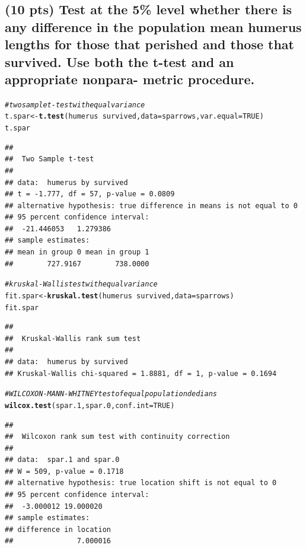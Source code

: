 \documentclass{article}\usepackage[]{graphicx}\usepackage[]{color}
\makeatletter
\newcommand{\hlnum}[1]{\textcolor[rgb]{0.686,0.059,0.569}{#1}}%
\newcommand{\hlcom}[1]{\textcolor[rgb]{0.678,0.584,0.686}{\textit{#1}}}%
\newcommand{\hlopt}[1]{\textcolor[rgb]{0,0,0}{#1}}%
\newcommand{\hlstd}[1]{\textcolor[rgb]{0.345,0.345,0.345}{#1}}%
\newcommand{\hlkwb}[1]{\textcolor[rgb]{0.69,0.353,0.396}{#1}}%
\newcommand{\hlkwc}[1]{\textcolor[rgb]{0.333,0.667,0.333}{#1}}%
\newcommand{\hlkwd}[1]{\textcolor[rgb]{0.737,0.353,0.396}{\textbf{#1}}}%
\newenvironment{kframe}{%
 \def\at@end@of@kframe{}%
 \ifinner\ifhmode%
  \def\at@end@of@kframe{\end{minipage}}%
  \begin{minipage}{\columnwidth}%
 \fi\fi%
 \def\FrameCommand##1{\hskip\@totalleftmargin \hskip-\fboxsep
 \colorbox{shadecolor}{##1}\hskip-\fboxsep
     \hskip-\linewidth \hskip-\@totalleftmargin \hskip\columnwidth}%
 \MakeFramed {\advance\hsize-\width
   \@totalleftmargin\z@ \linewidth\hsize
   \@setminipage}}%
 {\par\unskip\endMakeFramed%
 \at@end@of@kframe}
\newenvironment{knitrout}{}{} %
\makeatother
\begin{document}
\subsection{(10 pts) Test at the 5\% level whether there is any difference in the population mean humerus lengths for those that perished and those that survived. Use both the t-test and an appropriate nonpara-
metric procedure.}
\begin{knitrout}
\color{fgcolor}\begin{kframe}
\begin{alltt}
\hlcom{# two sample t-test with equal variance}
\hlstd{t.spar} \hlkwb{<-} \hlkwd{t.test}\hlstd{(humerus} \hlopt{~} \hlstd{survived,} \hlkwc{data} \hlstd{= sparrows,} \hlkwc{var.equal} \hlstd{=} \hlnum{TRUE}\hlstd{)}
\hlstd{t.spar}
\end{alltt}
\begin{verbatim}
## 
## 	Two Sample t-test
## 
## data:  humerus by survived
## t = -1.777, df = 57, p-value = 0.0809
## alternative hypothesis: true difference in means is not equal to 0
## 95 percent confidence interval:
##  -21.446053   1.279386
## sample estimates:
## mean in group 0 mean in group 1 
##        727.9167        738.0000
\end{verbatim}
\begin{alltt}
\hlcom{# kruskal-Wallis test with equal variance}
\hlstd{fit.spar} \hlkwb{<-} \hlkwd{kruskal.test}\hlstd{(humerus} \hlopt{~} \hlstd{survived,} \hlkwc{data} \hlstd{= sparrows)}
\hlstd{fit.spar}
\end{alltt}
\begin{verbatim}
## 
## 	Kruskal-Wallis rank sum test
## 
## data:  humerus by survived
## Kruskal-Wallis chi-squared = 1.8881, df = 1, p-value = 0.1694
\end{verbatim}
\begin{alltt}
\hlcom{#WILCOXON-MANN-WHITNEY test of equal population dedians}
\hlkwd{wilcox.test}\hlstd{(spar.1, spar.0,} \hlkwc{conf.int} \hlstd{=} \hlnum{TRUE}\hlstd{)}
\end{alltt}
\begin{verbatim}
## 
## 	Wilcoxon rank sum test with continuity correction
## 
## data:  spar.1 and spar.0
## W = 509, p-value = 0.1718
## alternative hypothesis: true location shift is not equal to 0
## 95 percent confidence interval:
##  -3.000012 19.000020
## sample estimates:
## difference in location 
##               7.000016
\end{verbatim}
\end{kframe}
\end{knitrout}
\end{document}
